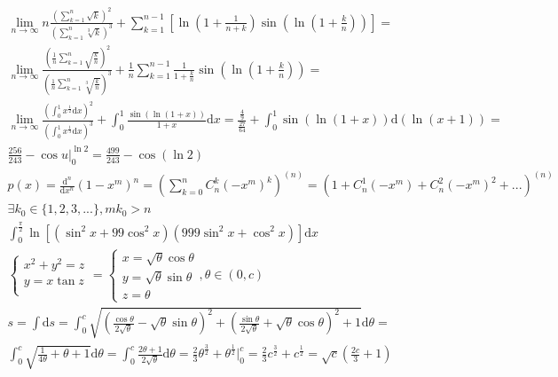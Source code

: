 \documentclass{article}
\begin{document}
\begin{align*}
    \lim_{n \to \infty} n\frac{\left(\sum_{k=1}^{n}\sqrt{k}\right)^2}{\left(\sum_{k=1}^{n}\sqrt[3]{k}\right)^3}+\sum_{k=1}^{n-1}\left[\ln\left(1+\frac{1}{n+k}\right)\sin\left(\ln\left(1+\frac{k}{n}\right)\right)\right] = \\ 
    \lim_{n \to \infty} \frac{\left(\frac{1}{n}\sum_{k=1}^{n}\sqrt{\frac{k}{n}}\right)^2}{\left(\frac{1}{n}\sum_{k=1}^{n}\sqrt[3]{\frac{k}{n}}\right)^3} + \frac{1}{n}\sum_{k=1}^{n-1}\frac{1}{1+\frac{k}{n}}\sin \left(\ln\left(1+\frac{k}{n}\right)\right) = \\
    \lim_{n \to \infty} \frac{\left(\int_{0}^{1}x^{\frac{1}{2}}\mathrm{d}x\right)^2}{\left(\int_{0}^{1}x^{\frac{1}{3}}\mathrm{d}x\right)^3} + \int_{0}^{1}\frac{\sin(\ln(1+x))}{1+x} \mathrm{d}x = \frac{\frac{4}{9}}{\frac{27}{64}} + \int_{0}^{1}\sin(\ln(1+x))\mathrm{d}(\ln(x+1)) = \\ 
    \frac{256}{243} - \cos u |_{0}^{\ln 2} = \frac{499}{243} - \cos(\ln 2) \\ 
    p(x) = \frac{\mathrm{d}^{n}}{\mathrm{d}x^{n}}(1-x^m)^{n} = \left(\sum_{k=0}^{n}C_{n}^{k}(-x^m)^{k}\right)^{(n)} = \left(1+C_{n}^{1}(-x^{m})+C_{n}^{2}(-x^{m})^2+...\right)^{(n)} \\
    \exists k_{0} \in \{1,2,3,...\},mk_{0} > n \\  
    \int_{0}^{\frac{\pi}{2}} \ln\left[\left(\sin^{2}x+99\cos^{2}x\right)\left(999\sin^{2}x+\cos^{2}x\right)\right] \mathrm{d}x \\
    \left\{
        \begin{array}{rl}
            x^2+y^2 = z \\
            y = x\tan z \\ 
        \end{array}
    \right. =  
    \left\{
        \begin{array}{rl}
            x = \sqrt{\theta} \cos \theta \\
            y = \sqrt{\theta} \sin \theta \\
            z = \theta 
        \end{array} , \theta \in (0,c)
    \right.\\ 
    s = \int\mathrm{d}s = \int_{0}^{c} \sqrt{\left(\frac{\cos \theta}{2\sqrt{\theta}}-\sqrt{\theta}\sin \theta\right)^2+\left(\frac{\sin \theta}{2\sqrt{\theta}}+\sqrt{\theta}\cos \theta\right)^2+1} \mathrm{d}\theta = \\
    \int_{0}^{c} \sqrt{\frac{1}{4\theta}+\theta+1}\mathrm{d}\theta = \int_{0}^{c}\frac{2\theta+1}{2\sqrt{\theta}}\mathrm{d}\theta = \frac{2}{3}\theta^{\frac{3}{2}}+\theta^{\frac{1}{2}}|_{0}^{c} = \frac{2}{3}c^{\frac{3}{2}}+c^{\frac{1}{2}} = \sqrt{c}\left(\frac{2c}{3}+1\right) \\ 

\end{align*}
\end{document}
